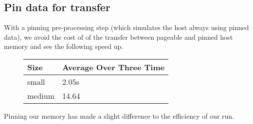 \subsection*{Pin data for transfer}
With a pinning pre-processing step (which simulates the host always using pinned data), we avoid the cost of of the transfer between pageable and pinned host memory and see the following speed up.
\begin{figure}[H]\centering \begin{tabular}{ l | l }
  \hline
  Size & Average Over Three Time \\
  \hline
  \hline
  small & 2.05s \\
  medium & 14.64 \\
  \hline
\end{tabular} \end{figure}

Pinning our memory has made a slight difference to the efficiency of our run.